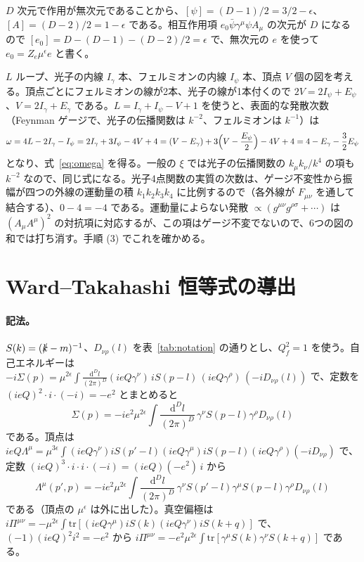 \documentclass[a4paper,10pt]{ltjsarticle}
\newcommand{\dd}{\mathrm{d}}
\begin{document}
$D$ 次元で作用が無次元であることから、$[\psi]=(D-1)/2=3/2-\epsilon$、$[A]=(D-2)/2=1-\epsilon$ である。相互作用項 $e_0\bar\psi\gamma^\mu\psi A_\mu$ の次元が $D$ になるので $[e_0]=D-(D-1)-(D-2)/2=\epsilon$ で、無次元の $e$ を使って $e_0=Z_e\mu^\epsilon e$ と書く。

$L$ ループ、光子の内線 $I_\gamma$ 本、フェルミオンの内線 $I_\psi$ 本、頂点 $V$ 個の図を考える。頂点ごとにフェルミオンの線が2本、光子の線が1本付くので $2V=2I_\psi+E_\psi$、$V=2I_\gamma+E_\gamma$ である。$L=I_\gamma+I_\psi-V+1$ を使うと、表面的な発散次数（Feynman ゲージで、光子の伝播関数は $k^{-2}$、フェルミオンは $k^{-1}$）は
\begin{equation*}
\omega=4L-2I_\gamma-I_\psi=2I_\gamma+3I_\psi-4V+4
=(V-E_\gamma)+3\Bigl(V-\frac{E_\psi}2\Bigr)-4V+4=4-E_\gamma-\frac32E_\psi
\end{equation*}
となり、式~\eqref{eq:omega} を得る。一般の $\xi$ では光子の伝播関数の $k_\mu k_\nu/k^4$ の項も $k^{-2}$ なので、同じ式になる。光子4点関数の実質の次数は、ゲージ不変性から振幅が四つの外線の運動量の積 $k_1k_2k_3k_4$ に比例するので（各外線が $F_{\mu\nu}$ を通して結合する）、$0-4=-4$ である。運動量によらない発散 $\propto(g^{\mu\nu}g^{\rho\sigma}+\cdots)$ は $(A_\mu A^\mu)^2$ の対抗項に対応するが、この項はゲージ不変でないので、6つの図の和では打ち消す。手順 (3) でこれを確かめる。

\section{Ward--Takahashi 恒等式の導出}\label{app:ward}

\paragraph{記法。}$S(k)=(\slashed k-m)^{-1}$、$D_{\nu\rho}(l)$ を表~\ref{tab:notation} の通りとし、$Q_f^2=1$ を使う。自己エネルギーは $-i\Sigma(p)=\mu^{2\epsilon}\int\frac{\dd^Dl}{(2\pi)^D}(ieQ\gamma^\nu)\,iS(p-l)\,(ieQ\gamma^\rho)\,(-iD_{\nu\rho}(l))$ で、定数を $(ieQ)^2\cdot i\cdot(-i)=-e^2$ とまとめると
\begin{equation*}
\Sigma(p)=-ie^2\mu^{2\epsilon}\int\frac{\dd^Dl}{(2\pi)^D}\,\gamma^\nu S(p-l)\gamma^\rho D_{\nu\rho}(l)
\end{equation*}
である。頂点は $ieQ\Lambda^\mu=\mu^{3\epsilon}\int(ieQ\gamma^\nu)iS(p'-l)(ieQ\gamma^\mu)iS(p-l)(ieQ\gamma^\rho)(-iD_{\nu\rho})$ で、定数 $(ieQ)^3\cdot i\cdot i\cdot(-i)=(ieQ)(-e^2)\,i$ から
\begin{equation*}
\Lambda^\mu(p',p)=-ie^2\mu^{2\epsilon}\int\frac{\dd^Dl}{(2\pi)^D}\,\gamma^\nu S(p'-l)\gamma^\mu S(p-l)\gamma^\rho D_{\nu\rho}(l)
\end{equation*}
である（頂点の $\mu^\epsilon$ は外に出した）。真空偏極は $i\Pi^{\mu\nu}=-\mu^{2\epsilon}\int\mathrm{tr}[(ieQ\gamma^\mu)iS(k)(ieQ\gamma^\nu)iS(k+q)]$ で、$(-1)(ieQ)^2i^2=-e^2$ から $i\Pi^{\mu\nu}=-e^2\mu^{2\epsilon}\int\mathrm{tr}[\gamma^\mu S(k)\gamma^\nu S(k+q)]$ である。
\end{document}
